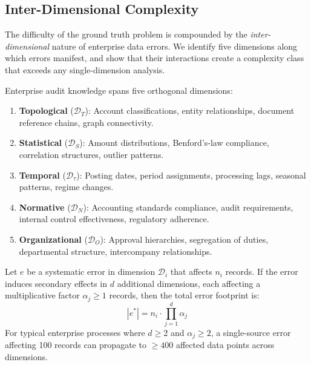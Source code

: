 \subsection{Inter-Dimensional Complexity}
\label{sec:gt_interdimensional}

The difficulty of the ground truth problem is compounded by the
\emph{inter-dimensional} nature of enterprise data errors.  We identify
five dimensions along which errors manifest, and show that their
interactions create a complexity class that exceeds any single-dimension
analysis.

\begin{definition}
\label{def:dimensions}
Enterprise audit knowledge spans five orthogonal dimensions:
\begin{enumerate}
  \item \textbf{Topological} ($\mathcal{D}_T$): Account classifications,
    entity relationships, document reference chains, graph connectivity.
  \item \textbf{Statistical} ($\mathcal{D}_S$): Amount distributions,
    Benford's-law compliance, correlation structures, outlier patterns.
  \item \textbf{Temporal} ($\mathcal{D}_\tau$): Posting dates, period
    assignments, processing lags, seasonal patterns, regime changes.
  \item \textbf{Normative} ($\mathcal{D}_N$): Accounting standards
    compliance, audit requirements, internal control effectiveness,
    regulatory adherence.
  \item \textbf{Organizational} ($\mathcal{D}_O$): Approval hierarchies,
    segregation of duties, departmental structure, intercompany
    relationships.
\end{enumerate}
\end{definition}

\begin{observation}
\label{thm:amplification}
Let $e$ be a systematic error in dimension $\mathcal{D}_i$ that affects
$n_i$ records.  If the error induces secondary effects in $d$ additional
dimensions, each affecting a multiplicative factor $\alpha_j \geq 1$
records, then the total error footprint is:
\begin{equation}
|e^*| = n_i \cdot \prod_{j=1}^{d} \alpha_j
\label{eq:amplification}
\end{equation}
For typical enterprise processes where $d \geq 2$ and $\alpha_j \geq 2$,
a single-source error affecting 100 records can propagate to $\geq 400$
affected data points across dimensions.
\end{observation}

